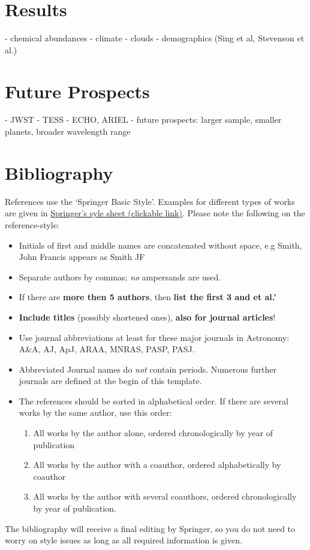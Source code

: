 \documentclass[graybox,natbib,nosecnum]{svmult}
\begin{document}
\section{Results}
- chemical abundances
- climate
- clouds
- demographics (Sing et al, Stevenson et al.)

\section{Future Prospects}
 - JWST
 - TESS
 - ECHO, ARIEL
 - future prospects: larger sample, smaller planets, broader wavelength range

\section{Bibliography}
References use the `Springer Basic Style'. Examples for different types of works are given in \href{https://meteor.springer.com/exoplanets/?id=435&tab=About&mode=ReadPage&entity=3283}{\ul{Springer's syle sheet (clickable link)}}. 
\noindent Please note the following on the reference-style:
\begin{itemize}
\item{Initials of first and middle names are concatenated without space, e.g Smith, John Francis appears as Smith JF}
\item{Separate authors by commas; \emph{no} ampersands are used.}
\item{If there are {\bf more then 5 authors}, then {\bf list the first 3 and et al.'}}
\item{{\bf Include titles} (possibly shortened ones), {\bf also for journal articles}!  }
\item{Use journal abbreviations at least for these major journals in Astronomy: A\&A, AJ, ApJ, ARAA, MNRAS, PASP, PASJ. }
\item{Abbreviated Journal names do \emph{not} contain periods. Numerous further journals are defined at the begin of this template. }
\item{The references should be sorted in alphabetical order. If there are several works by the same author, use this order: }
\begin{enumerate}
\item All works by the author alone, ordered chronologically by year of publication
\item All works by the author with a coauthor, ordered alphabetically by coauthor
\item All works by the author with several coauthors, ordered chronologically by year of publication.
\end{enumerate}
\end{itemize}
The bibliography will receive a final editing by Springer, so you do not need to worry on style issues as long as all required information is given.
\end{document}
